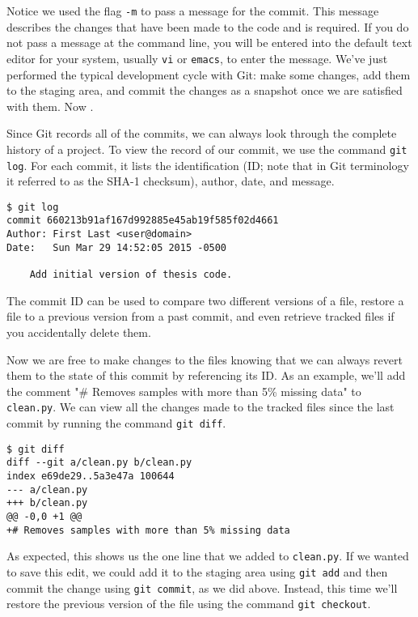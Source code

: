 Notice we used the flag \verb|-m| to pass a message for the commit.
This message describes the changes that have been made to the code and is required.
If you do not pass a message at the command line, you will be entered into the default text editor for your system, usually \verb|vi| or \verb|emacs|, to enter the message.
We've just performed the typical development cycle with Git:
make some changes, add them to the staging area, and commit the changes as a snapshot once we are satisfied with them.
Now .

Since Git records all of the commits, we can always look through the complete history of a project.
To view the record of our commit, we use the command \verb|git log|.
For each commit, it lists the identification (ID; note that in Git terminology it referred to as the SHA-1 checksum), author, date, and message.

\begin{lstlisting}
$ git log
commit 660213b91af167d992885e45ab19f585f02d4661
Author: First Last <user@domain>
Date:   Sun Mar 29 14:52:05 2015 -0500

    Add initial version of thesis code.
\end{lstlisting}

The commit ID can be used to compare two different versions of a file, restore a file to a previous version from a past commit, and even retrieve tracked files if you accidentally delete them.

Now we are free to make changes to the files knowing that we can always revert them to the state of this commit by referencing its ID.
As an example, we'll add the comment "\# Removes samples with more than 5\% missing data" to \verb|clean.py|.
We can view all the changes made to the tracked files since the last commit by running the command \verb|git diff|.

\begin{lstlisting}
$ git diff
diff --git a/clean.py b/clean.py
index e69de29..5a3e47a 100644
--- a/clean.py
+++ b/clean.py
@@ -0,0 +1 @@
+# Removes samples with more than 5% missing data
\end{lstlisting}

As expected, this shows us the one line that we added to \verb|clean.py|.
If we wanted to save this edit, we could add it to the staging area using \verb|git add| and then commit the change using \verb|git commit|, as we did above.
Instead, this time we'll restore the previous version of the file using the command \verb|git checkout|.

